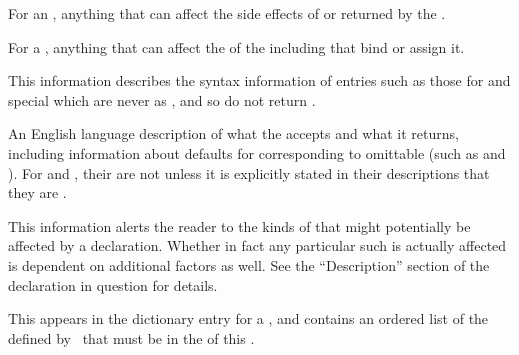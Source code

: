 
For an , anything that can affect the side effects of
or  returned by the .

For a , anything that can affect the  of the 
including  that bind or assign it.

\endsubsubsection%


This information describes the syntax information of entries such as those for
 and special  which are never 
as , and so do not return .

\endsubsubsection%


An English language description of what  the  accepts
and what  it returns, including information about defaults for 
corresponding to omittable 
(such as  and ).
For  and ,
their  are not  unless it is explicitly stated in their
descriptions that they are .

\endsubsubsection%


This information alerts the reader to the kinds of  that might 
potentially be affected by a declaration.  Whether in fact any particular such
 is actually affected is dependent on additional factors as well.
See the ``Description'' section of the declaration in question for details.

\endsubsubsection%


This appears in the dictionary entry for a ,
and contains an ordered list of the  defined 
by \clisp\ that must be in the  of this .

